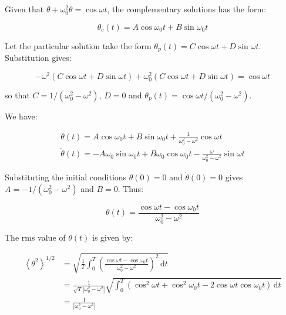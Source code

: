 \documentclass[12pt]{article}
\begin{document}
Given that $\ddot{\theta} + \omega_{0}^{2} \theta = \cos{\omega t}$, the complementary solutions has the form:

\begin{equation}
    \theta_{c}(t) = A\cos{\omega_{0} t} + B\sin{\omega_{0} t}
\end{equation}

Let the particular solution take the form $\theta_{p}(t) = C\cos{\omega t} + D\sin{\omega t}$. Substitution gives:

\begin{equation}
    -\omega^{2}(C\cos{\omega t} + D\sin{\omega t}) + \omega_{0}^{2}(C\cos{\omega t} + D\sin{\omega t}) = \cos{\omega t}
\end{equation}

so that $C = 1/(\omega_{0}^{2} - \omega^{2})$, $D = 0$ and $\theta_{p}(t) = \cos{\omega t}/(\omega_{0}^{2} - \omega^{2})$.

We have:

\begin{equation}
    \begin{split}
        \theta(t) = A\cos{\omega_{0} t} + B\sin{\omega_{0} t} + \frac{1}{\omega_{0}^{2} - \omega^{2}}\cos{\omega t} \\
        \dot{\theta}(t) = -A\omega_{0}\sin{\omega_{0} t} + B\omega_{0}\cos{\omega_{0} t} - \frac{\omega}{\omega_{0}^{2} - \omega^{2}}\sin{\omega t}
    \end{split}
\end{equation}

Substituting the initial conditions $\theta(0) = 0$ and $\dot{\theta}(0) = 0$ gives $A = -1/(\omega_{0}^{2} - \omega^{2})$ and $B = 0$. Thus:

\begin{equation}
    \theta(t) = \frac{\cos{\omega t} - \cos{\omega_{0} t}}{\omega_{0}^{2} - \omega^{2}}
\end{equation}

The rms value of $\theta(t)$ is given by:

\begin{equation}
    \begin{split}
        \left\langle \theta^{2} \right\rangle^{1/2} &= \sqrt{\frac{1}{T}\int_{0}^{T} \left( \frac{\cos{\omega t} - \cos{\omega_{0} t}}{\omega_{0}^{2} - \omega^{2}} \right)^{2} \, \mathrm{d}t} \\
        &= \frac{1}{\sqrt{T} \left\lvert \omega_{0}^{2} - \omega^{2} \right\rvert} \sqrt{\int_{0}^{T} (\cos^{2}{\omega t} + \cos^{2}{\omega_{0} t} - 2\cos{\omega t}\cos{\omega_{0} t}) \, \mathrm{d}t} \\
        &= \frac{1}{\left\lvert \omega_{0}^{2} - \omega^{2} \right\rvert}
    \end{split}
\end{equation}
\end{document}
